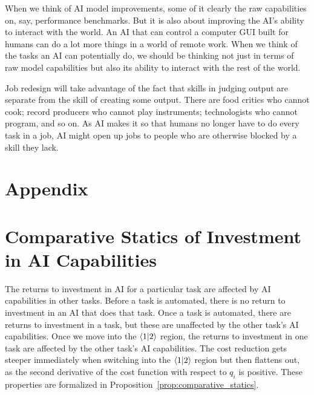 \documentclass{article}
\theoremstyle{plain}
\theoremstyle{plain}
\begin{document}
When we think of AI model improvements, some of it clearly the raw capabilities on, say, performance benchmarks. 
But it is also about improving the AI's ability to interact with the world. 
An AI that can control a computer GUI built for humans can do a lot more things in a world of remote work.
When we think of the tasks an AI can potentially do, we should be thinking not just in terms of raw model capabilities but also its ability to interact with the rest of the world.

Job redesign will take advantage of the fact that skills in judging output are separate from the skill of creating some output.
There are food critics who cannot cook; record producers who cannot play instruments; technologists who cannot program, and so on.
As AI makes it so that humans no longer have to do every task in a job, AI might open up jobs to people who are otherwise blocked by a skill they lack.




\newpage
\appendix
\section*{Appendix}



\section{Comparative Statics of Investment in AI Capabilities}
\label{app:AI_capability_inv_comp_stat}
The returns to investment in AI for a particular task are affected by AI capabilities in other tasks.
Before a task is automated, there is no return to investment in an AI that does that task.
Once a task is automated, there are returns to investment in a task, but these are unaffected by the other task's AI capabilities.
Once we move into the \(\langle 1|2 \rangle\) region, the returns to investment in one task are affected by the other task's AI capabilities.
The cost reduction gets steeper immediately when switching into the \(\langle 1|2 \rangle\) region but then flattens out, as the second derivative of the cost function with respect to \(q_i\) is positive.
These properties are formalized in Proposition~\ref{prop:comparative_statics}.
\end{document}
